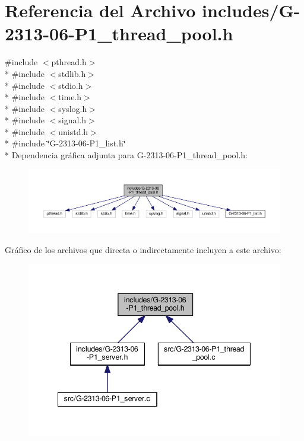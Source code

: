 \hypertarget{G-2313-06-P1__thread__pool_8h}{}\section{Referencia del Archivo includes/\+G-\/2313-\/06-\/\+P1\+\_\+thread\+\_\+pool.h}
\label{G-2313-06-P1__thread__pool_8h}
{\ttfamily \#include $<$pthread.\+h$>$}\\*
{\ttfamily \#include $<$stdlib.\+h$>$}\\*
{\ttfamily \#include $<$stdio.\+h$>$}\\*
{\ttfamily \#include $<$time.\+h$>$}\\*
{\ttfamily \#include $<$syslog.\+h$>$}\\*
{\ttfamily \#include $<$signal.\+h$>$}\\*
{\ttfamily \#include $<$unistd.\+h$>$}\\*
{\ttfamily \#include \char`\"{}G-\/2313-\/06-\/\+P1\+\_\+list.\+h\char`\"{}}\\*
Dependencia gráfica adjunta para G-\/2313-\/06-\/\+P1\+\_\+thread\+\_\+pool.h\+:\nopagebreak
\begin{figure}[H]
\begin{center}
\leavevmode
\includegraphics[width=350pt]{G-2313-06-P1__thread__pool_8h__incl}
\end{center}
\end{figure}
Gráfico de los archivos que directa o indirectamente incluyen a este archivo\+:\nopagebreak
\begin{figure}[H]
\begin{center}
\leavevmode
\includegraphics[width=341pt]{G-2313-06-P1__thread__pool_8h__dep__incl}
\end{center}
\end{figure}
